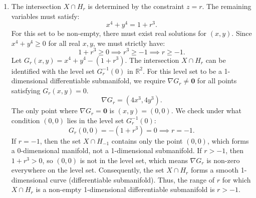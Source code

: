 \documentclass[10pt,a4paper]{article}
\begin{document}
\begin{enumerate}[label=\fbox{\arabic*}]
\begin{enumerate}[label=(\arabic*)]
          \item The intersection $X \cap H_r$ is determined by the constraint $z = r$. The remaining variables must satisfy:
          \[
            x^4 + y^4 = 1 + r^3.
          \]
          For this set to be non-empty, there must exist real solutions for $(x, y)$. Since $x^4 + y^4 \ge 0$ for all real $x, y$, we must strictly have:
          \[
            1 + r^3 \ge 0 \implies r^3 \ge -1 \implies r \ge -1.
          \]
          Let $G_r(x,y) = x^4 + y^4 - (1+r^3)$. The intersection $X \cap H_r$ can be identified with the level set $G_r^{-1}(0)$ in $\mathbb{R}^2$.
          For this level set to be a 1-dimensional differentiable submanifold, we require $\nabla G_r \neq \mathbf{0}$ for all points satisfying $G_r(x,y) = 0$.
          \[
            \nabla G_r = (4x^3, 4y^3).
          \]
          The only point where $\nabla G_r = \mathbf{0}$ is $(x, y) = (0,0)$.
          We check under what condition $(0,0)$ lies in the level set $G_r^{-1}(0)$:
          \[
            G_r(0,0) = -(1+r^3) = 0 \implies r = -1.
          \]
          If $r = -1$, then the set $X \cap H_{-1}$ contains only the point $(0,0)$, which forms a 0-dimensional manifold, not a 1-dimensional submanifold.
          If $r > -1$, then $1+r^3 > 0$, so $(0,0)$ is not in the level set, which means $\nabla G_r$ is non-zero everywhere on the level set. Consequently, the set $X \cap H_r$ forms a smooth 1-dimensional curve (differentiable submanifold).
          Thus, the range of $r$ for which $X \cap H_r$ is a non-empty 1-dimensional differentiable submanifold is $r > -1$.
        \end{enumerate}
\end{enumerate}
\end{document}
